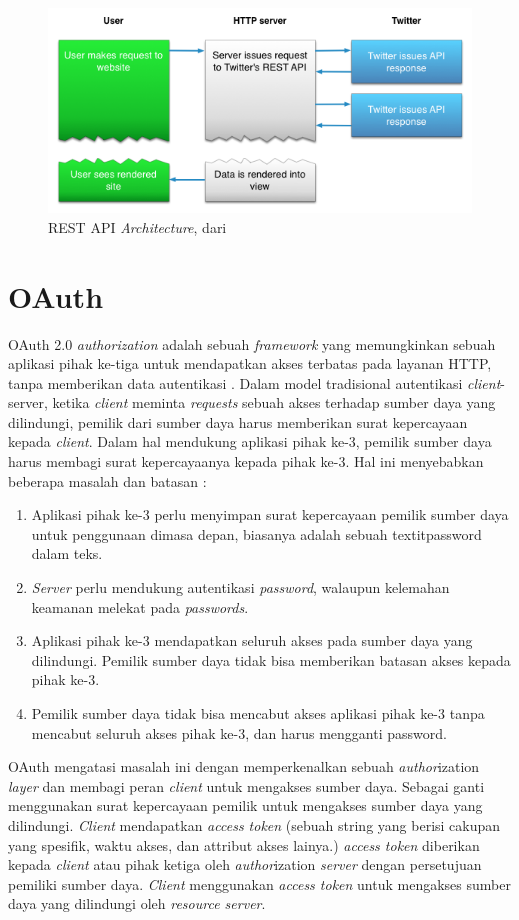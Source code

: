 \begin{figure}
\centering
\includegraphics[width=0.8\linewidth]{Gambar/mine/restapi}
\caption[REST API \textit{Architecture}, dari \cite{RESTAPI:2015}]{REST API \textit{Architecture}, dari \cite{RESTAPI:2015}} 
\label{fig:rest_api}
\end{figure}
\section{OAuth}
OAuth 2.0 \textit{authorization} adalah sebuah \textit{framework} yang memungkinkan sebuah aplikasi pihak ke-tiga untuk mendapatkan akses terbatas pada layanan HTTP, tanpa memberikan data autentikasi \cite{RFCOAuth:2012}. Dalam model tradisional autentikasi \textit{client}-server, ketika \textit{client} meminta \textit{requests} sebuah akses terhadap sumber daya yang dilindungi, pemilik dari sumber daya harus memberikan surat kepercayaan kepada \textit{client}. Dalam hal mendukung aplikasi pihak ke-3, pemilik sumber daya harus membagi surat kepercayaanya kepada pihak ke-3. Hal ini menyebabkan beberapa masalah dan batasan : 
\begin{enumerate}
	\item Aplikasi pihak ke-3 perlu menyimpan surat kepercayaan pemilik sumber daya untuk penggunaan dimasa depan, biasanya adalah sebuah textit{password} dalam teks.
	\item \textit{Server}  perlu mendukung autentikasi \textit{password}, walaupun kelemahan keamanan melekat pada \textit{passwords}.
	\item Aplikasi pihak ke-3 mendapatkan seluruh akses pada sumber daya yang dilindungi. Pemilik sumber daya tidak bisa memberikan batasan akses kepada pihak ke-3.
	\item Pemilik sumber daya tidak bisa mencabut akses aplikasi pihak ke-3 tanpa mencabut seluruh akses pihak ke-3, dan harus mengganti password.
\end{enumerate}
OAuth mengatasi masalah ini dengan memperkenalkan sebuah \textit{author}ization \textit{layer} dan membagi peran \textit{client} untuk mengakses sumber daya. Sebagai ganti menggunakan surat kepercayaan pemilik untuk mengakses sumber daya yang dilindungi. \textit{Client} mendapatkan \textit{access token} (sebuah string yang berisi cakupan yang spesifik, waktu akses, dan attribut akses lainya.) \textit{access token} diberikan kepada \textit{client} atau pihak ketiga oleh \textit{author}ization \textit{server}  dengan persetujuan pemiliki sumber daya. \textit{Client} menggunakan \textit{access token} untuk mengakses sumber daya yang dilindungi oleh \textit{resource server}.\\\\
